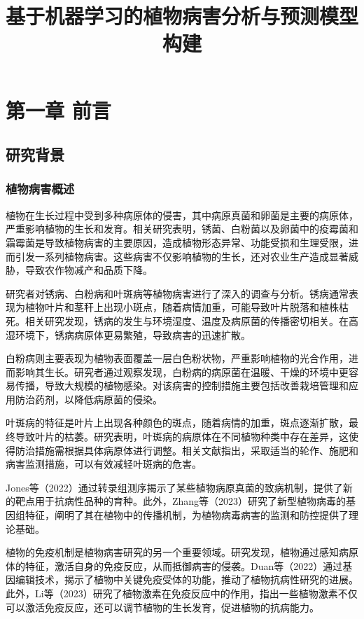 \documentclass{article}
\title{基于机器学习的植物病害分析与预测模型构建}
\author{}
\date{}
\begin{document}
	
	\maketitle
	
	\tableofcontents
	
	\section{第一章 前言}
	\subsection{研究背景}
	\subsubsection{植物病害概述}
植物在生长过程中受到多种病原体的侵害，其中病原真菌和卵菌是主要的病原体，严重影响植物的生长和发育。相关研究表明，锈菌、白粉菌以及卵菌中的疫霉菌和霜霉菌是导致植物病害的主要原因，造成植物形态异常、功能受损和生理受限，进而引发一系列植物病害。这些病害不仅影响植物的生长，还对农业生产造成显著威胁，导致农作物减产和品质下降。

研究者对锈病、白粉病和叶斑病等植物病害进行了深入的调查与分析。锈病通常表现为植物叶片和茎秆上出现小斑点，随着病情加重，可能导致叶片脱落和植株枯死。相关研究发现，锈病的发生与环境湿度、温度及病原菌的传播密切相关。在高湿环境下，锈病病原体更易繁殖，导致病害的迅速扩散。

白粉病则主要表现为植物表面覆盖一层白色粉状物，严重影响植物的光合作用，进而影响其生长。研究者通过观察发现，白粉病的病原菌在温暖、干燥的环境中更容易传播，导致大规模的植物感染。对该病害的控制措施主要包括改善栽培管理和应用防治药剂，以降低病原菌的侵染。

叶斑病的特征是叶片上出现各种颜色的斑点，随着病情的加重，斑点逐渐扩散，最终导致叶片的枯萎。研究表明，叶斑病的病原体在不同植物种类中存在差异，这使得防治措施需根据具体病原体进行调整。相关文献指出，采取适当的轮作、施肥和病害监测措施，可以有效减轻叶斑病的危害。

Jones等（2022）通过转录组测序揭示了某些植物病原真菌的致病机制，提供了新的靶点用于抗病性品种的育种\cite{Jones2022}。此外，Zhang等（2023）研究了新型植物病毒的基因组特征，阐明了其在植物中的传播机制，为植物病毒病害的监测和防控提供了理论基础\cite{Zhang2023}。

植物的免疫机制是植物病害研究的另一个重要领域。研究发现，植物通过感知病原体的特征，激活自身的免疫反应，从而抵御病害的侵袭。Duan等（2022）通过基因编辑技术，揭示了植物中关键免疫受体的功能，推动了植物抗病性研究的进展\cite{Duan2022}。此外，Li等（2023）研究了植物激素在免疫反应中的作用，指出一些植物激素不仅可以激活免疫反应，还可以调节植物的生长发育，促进植物的抗病能力\cite{Li2023}。
\end{document}
